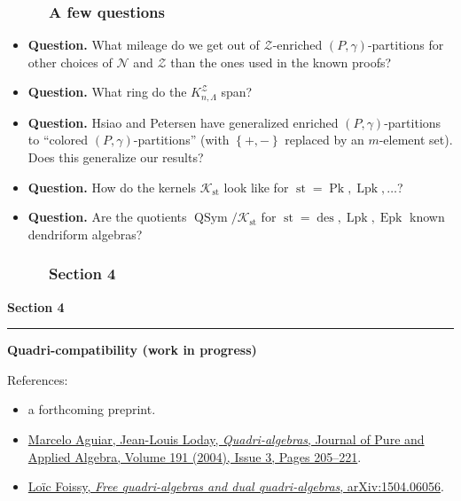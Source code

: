 \documentclass{beamer}
\newcommand{\red}{\color{red}}
\newcommand{\Lpk}{\operatorname{Lpk}}
\newcommand{\Pk}{\operatorname{Pk}}
\newcommand{\Epk}{\operatorname{Epk}}
\newcommand{\des}{\operatorname{des}}
\newcommand{\st}{\operatorname{st}}
\newcommand{\QSym}{\operatorname{QSym}}
\newcommand{\calN}{\mathcal{N}}
\newcommand{\calZ}{\mathcal{Z}}
\newcommand{\fti}[1]{\frametitle{\ \ \ \ \ #1}}
\newcommand{\set}[1]{\left\{ #1 \right\}}
\newcommand{\tup}[1]{\left( #1 \right)}
\theoremstyle{plain}
\begin{document}
\begin{frame}
\fti{A few questions}

\begin{itemize}

\item \textbf{Question.}
      What mileage do we get out of $\calZ$-enriched
      $\tup{P,\gamma}$-partitions for other choices of
      $\calN$ and $\calZ$ than the ones used in the known proofs?

\item \textbf{Question.}
      What ring do the $K^{\calZ}_{n,\Lambda}$ span?

\item \textbf{Question.}
      Hsiao and Petersen have generalized enriched
      $\tup{P, \gamma}$-partitions to ``colored
      $\tup{P, \gamma}$-partitions'' (with $\set{+,-}$
      replaced by an $m$-element set).
      Does this generalize our results?

\item \textbf{Question.}
      How do the kernels $\mathcal{K}_{\st}$ look like for
      $\st = \Pk, \Lpk, \ldots$?

\item \textbf{Question.}
      Are the quotients $\QSym / \mathcal{K}_{\st}$ for
      $\st = \des, \Lpk, \Epk$ known dendriform algebras?

\end{itemize}

\end{frame}

\begin{frame}
\fti{Section 4}
\begin{center}
{\LARGE \bf Section 4} \\
\noindent\rule[0.5ex]{\linewidth}{1pt}
{\Large \bf Quadri-compatibility (work in progress)}
\end{center}
\vspace{1cm}
References:
\begin{itemize}
\item a forthcoming preprint.
\item {\red \href{https://doi.org/10.1016/j.jpaa.2004.01.002}{Marcelo Aguiar, Jean-Louis Loday, \textit{Quadri-algebras}, Journal of Pure and Applied Algebra, Volume 191 (2004), Issue 3, Pages 205--221}}.
\item {\red \href{https://arxiv.org/abs/1504.06056}{Loïc Foissy, \textit{Free quadri-algebras and dual quadri-algebras}, arXiv:1504.06056}}.
\end{itemize}
\end{frame}
\end{document}
